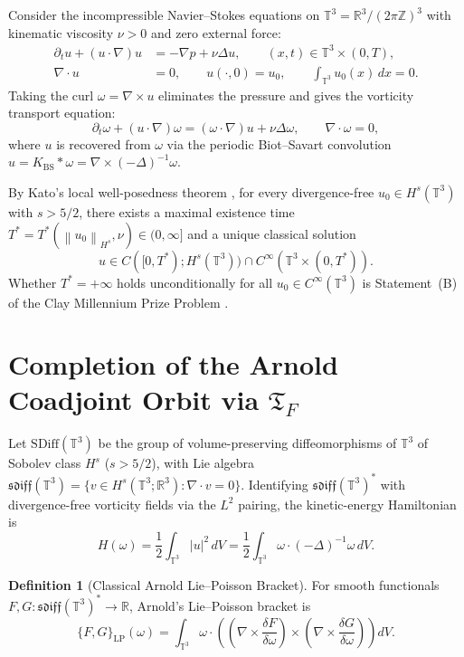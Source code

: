 \documentclass[11pt,reqno]{amsart}
\theoremstyle{definition}
\newtheorem{definition}[theorem]{Definition}
\newcommand{\T}{\mathbb{T}^3}
\newcommand{\R}{\mathbb{R}}
\newcommand{\Z}{\mathbb{Z}}
\newcommand{\SDiff}{\mathrm{SDiff}(\T)}
\newcommand{\sdiff}{\mathfrak{sdiff}(\T)}
\newcommand{\TF}{\mathfrak{T}_F}
\newcommand{\KBS}{K_{\mathrm{BS}}}
\newcommand{\norm}[1]{\left\| #1 \right\|}
\newcommand{\abs}[1]{\left| #1 \right|}
\begin{document}
Consider the incompressible Navier--Stokes equations on $\T = \R^3 / (2\pi\Z)^3$ with kinematic viscosity $\nu > 0$ and zero external force:
\begin{align}
\partial_t u + (u \cdot \nabla) u &= -\nabla p + \nu \Delta u, \qquad (x,t) \in \T \times (0, T), \label{eq:NS_vel}\\
\nabla \cdot u &= 0, \qquad u(\cdot, 0) = u_0, \qquad \int_{\T} u_0(x)\,dx = 0. \label{eq:NS_div}
\end{align}
Taking the curl $\omega = \nabla \times u$ eliminates the pressure and gives the vorticity transport equation:
\begin{equation}\label{eq:vorticity}
\partial_t \omega + (u \cdot \nabla)\omega = (\omega \cdot \nabla)u + \nu \Delta \omega, \qquad \nabla \cdot \omega = 0,
\end{equation}
where $u$ is recovered from $\omega$ via the periodic Biot--Savart convolution $u = \KBS * \omega = \nabla \times (-\Delta)^{-1}\omega$.

By Kato's local well-posedness theorem \cite{Kato1972}, for every divergence-free $u_0 \in H^s(\T)$ with $s > 5/2$, there exists a maximal existence time $T^* = T^*(\norm{u_0}_{H^s}, \nu) \in (0, \infty]$ and a unique classical solution
\[
u \in C([0, T^*); H^s(\T)) \cap C^\infty(\T \times (0, T^*)).
\]
Whether $T^* = +\infty$ holds unconditionally for all $u_0 \in C^\infty(\T)$ is Statement~(B) of the Clay Millennium Prize Problem \cite{Fefferman2000}.

\section{Completion of the Arnold Coadjoint Orbit via $\TF$}

Let $\SDiff$ be the group of volume-preserving diffeomorphisms of $\T$ of Sobolev class $H^s$ ($s > 5/2$), with Lie algebra $\sdiff = \{v \in H^s(\T; \R^3) : \nabla \cdot v = 0\}$. Identifying $\sdiff^*$ with divergence-free vorticity fields via the $L^2$ pairing, the kinetic-energy Hamiltonian is
\begin{equation}\label{eq:Hamiltonian}
H(\omega) = \frac{1}{2} \int_{\T} \abs{u}^2 \, dV = \frac{1}{2} \int_{\T} \omega \cdot (-\Delta)^{-1}\omega \, dV.
\end{equation}

\begin{definition}[Classical Arnold Lie--Poisson Bracket]\label{def:arnold}
For smooth functionals $F, G : \sdiff^* \to \R$, Arnold's Lie--Poisson bracket \cite{Arnold1966} is
\begin{equation}\label{eq:arnold_bracket}
\{F, G\}_{\mathrm{LP}}(\omega) = \int_{\T} \omega \cdot \left( \left(\nabla \times \frac{\delta F}{\delta \omega}\right) \times \left(\nabla \times \frac{\delta G}{\delta \omega}\right) \right) dV.
\end{equation}
\end{definition}
\end{document}
